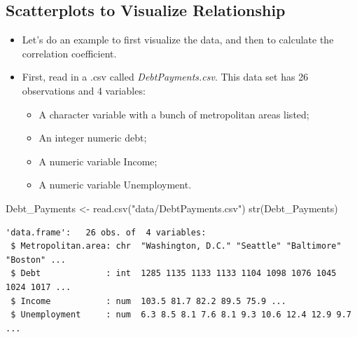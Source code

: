 \documentclass[
  letterpaper,
  DIV=11,
  numbers=noendperiod]{scrreprt}
\newenvironment{Shaded}{\begin{snugshade}}{\end{snugshade}}
\newcommand{\FunctionTok}[1]{\textcolor[rgb]{0.28,0.35,0.67}{#1}}
\newcommand{\NormalTok}[1]{\textcolor[rgb]{0.00,0.23,0.31}{#1}}
\newcommand{\OtherTok}[1]{\textcolor[rgb]{0.00,0.23,0.31}{#1}}
\newcommand{\StringTok}[1]{\textcolor[rgb]{0.13,0.47,0.30}{#1}}
\providecommand{\tightlist}{%
  \setlength{\itemsep}{0pt}\setlength{\parskip}{0pt}}\usepackage{longtable,booktabs,array}
\begin{document}
\subsection{Scatterplots to Visualize
Relationship}\label{scatterplots-to-visualize-relationship}

\begin{itemize}
\item
  Let's do an example to first visualize the data, and then to calculate
  the correlation coefficient.
\item
  First, read in a .csv called \emph{DebtPayments.csv}. This data set
  has 26 observations and 4 variables:

  \begin{itemize}
  \tightlist
  \item
    A character variable with a bunch of metropolitan areas listed;
  \item
    An integer numeric debt;
  \item
    A numeric variable Income;
  \item
    A numeric variable Unemployment.
  \end{itemize}
\end{itemize}

\begin{Shaded}
\begin{Highlighting}[]
\NormalTok{Debt\_Payments }\OtherTok{\textless{}{-}} \FunctionTok{read.csv}\NormalTok{(}\StringTok{"data/DebtPayments.csv"}\NormalTok{)}
\FunctionTok{str}\NormalTok{(Debt\_Payments)}
\end{Highlighting}
\end{Shaded}

\begin{verbatim}
'data.frame':   26 obs. of  4 variables:
 $ Metropolitan.area: chr  "Washington, D.C." "Seattle" "Baltimore" "Boston" ...
 $ Debt             : int  1285 1135 1133 1133 1104 1098 1076 1045 1024 1017 ...
 $ Income           : num  103.5 81.7 82.2 89.5 75.9 ...
 $ Unemployment     : num  6.3 8.5 8.1 7.6 8.1 9.3 10.6 12.4 12.9 9.7 ...
\end{verbatim}
\end{document}
